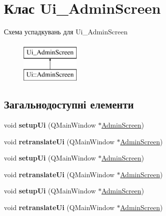 \hypertarget{classUi__AdminScreen}{\section{Клас Ui\-\_\-\-Admin\-Screen}
\label{classUi__AdminScreen}
}
Схема успадкувань для Ui\-\_\-\-Admin\-Screen\begin{figure}[H]
\begin{center}
\leavevmode
\includegraphics[height=2.000000cm]{classUi__AdminScreen}
\end{center}
\end{figure}
\subsection*{Загальнодоступні елементи}
\begin{DoxyCompactItemize}
\item 
\hypertarget{classUi__AdminScreen_a0a67dc309a34eb0240dedbd00754fd7e}{void {\bfseries setup\-Ui} (Q\-Main\-Window $\ast$\hyperlink{classAdminScreen}{Admin\-Screen})}\label{classUi__AdminScreen_a0a67dc309a34eb0240dedbd00754fd7e}

\item 
\hypertarget{classUi__AdminScreen_aa6891d66f0e464aa293fd66b1330cc19}{void {\bfseries retranslate\-Ui} (Q\-Main\-Window $\ast$\hyperlink{classAdminScreen}{Admin\-Screen})}\label{classUi__AdminScreen_aa6891d66f0e464aa293fd66b1330cc19}

\item 
\hypertarget{classUi__AdminScreen_a0a67dc309a34eb0240dedbd00754fd7e}{void {\bfseries setup\-Ui} (Q\-Main\-Window $\ast$\hyperlink{classAdminScreen}{Admin\-Screen})}\label{classUi__AdminScreen_a0a67dc309a34eb0240dedbd00754fd7e}

\item 
\hypertarget{classUi__AdminScreen_aa6891d66f0e464aa293fd66b1330cc19}{void {\bfseries retranslate\-Ui} (Q\-Main\-Window $\ast$\hyperlink{classAdminScreen}{Admin\-Screen})}\label{classUi__AdminScreen_aa6891d66f0e464aa293fd66b1330cc19}

\item 
\hypertarget{classUi__AdminScreen_a0a67dc309a34eb0240dedbd00754fd7e}{void {\bfseries setup\-Ui} (Q\-Main\-Window $\ast$\hyperlink{classAdminScreen}{Admin\-Screen})}\label{classUi__AdminScreen_a0a67dc309a34eb0240dedbd00754fd7e}

\item 
\hypertarget{classUi__AdminScreen_aa6891d66f0e464aa293fd66b1330cc19}{void {\bfseries retranslate\-Ui} (Q\-Main\-Window $\ast$\hyperlink{classAdminScreen}{Admin\-Screen})}\label{classUi__AdminScreen_aa6891d66f0e464aa293fd66b1330cc19}

\end{DoxyCompactItemize}

